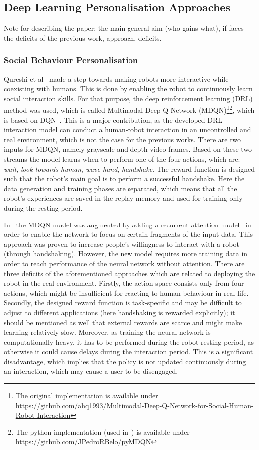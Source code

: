 \documentclass[thesis]{mas_proposal}
\begin{document}
\subsection{Deep Learning Personalisation Approaches}

{\color{red}Note for describing the paper: the main general aim (who gains what), if faces the deficits of the previous work, approach, deficits.}

\subsubsection{Social Behaviour Personalisation}
Qureshi et al~\cite{Qureshi2016} made a step towards making robots more interactive while coexisting with humans. This is done by enabling the robot to continuously learn social interaction skills. For that purpose, the deep reinforcement learning (DRL) method was used, which is called Multimodal Deep Q-Network (MDQN)\footnote{The original implementation is available under \url{https://github.com/ahq1993/Multimodal-Deep-Q-Network-for-Social-Human-Robot-Interaction}}\footnote{The python implementation (used in~\cite{Belo2021}) is available under \url{https://github.com/JPedroRBelo/pyMDQN}}, which is based on DQN~\cite{mnih2015human}. This is a major contribution, as the developed DRL interaction model can conduct a human-robot interaction in an uncontrolled and real environment, which is not the case for the previous works. There are two inputs for MDQN, namely grayscale and depth video frames. Based on these two streams the model learns when to perform one of the four actions, which are: \emph{wait}, \emph{look towards human}, \emph{wave hand}, \emph{handshake}. The reward function is designed such that the robot's main goal is to perform a successful handshake. Here the data generation and training phases are separated, which means that all the robot's experiences are saved in the replay memory and used for training only during the resting period. 

In~\cite{Qureshi2017} the MDQN model was augmented by adding a recurrent attention model~\cite{sorokin2015deep} in order to enable the network to focus on certain fragments of the input data. This approach was proven to increase people's willingness to interact with a robot (through handshaking). However, the new model requires more training data in order to reach performance of the neural network without attention. There are three deficits of the aforementioned approaches which are related to deploying the robot in the real environment. Firstly, the action space consists only from four actions, which might be insufficient for reacting to human behaviour in real life. Secondly, the designed reward function is task-specific and may be difficult to adjust to different applications (here handshaking is rewarded explicitly); it should be mentioned as well that external rewards are scarce and might make learning relatively slow. Moreover, as training the neural network is computationally heavy, it has to be performed during the robot resting period, as otherwise it could cause delays during the interaction period. This is a significant disadvantage, which implies that the policy is not updated continuously during an interaction, which may cause a user to be disengaged. 
\end{document}
